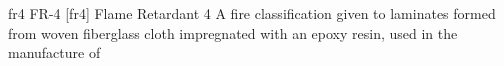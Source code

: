 \newglsXacronym%
{fr4}%
{FR-4}%
[fr4]%
{Flame Retardant 4}%
{A fire classification given to laminates formed from woven fiberglass cloth impregnated with an epoxy resin, used in the manufacture of }%